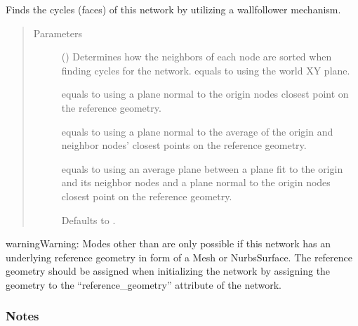 \documentclass[letterpaper,10pt,english]{sphinxmanual}
\begin{document}
\begin{fulllineitems}
\begin{fulllineitems}
\label{\detokenize{cockatoo:cockatoo.KnitNetwork.find_cycles}}
Finds the cycles (faces) of this network by utilizing a wall\sphinxhyphen{}follower
mechanism.
\begin{quote}\begin{description}
\item[{Parameters}] \leavevmode
{} (\sphinxstyleliteralemphasis{\sphinxupquote{, }}) \textendash{} 
Determines how the neighbors of each node are sorted when finding
cycles for the network.
 equals to using the world XY plane.

 equals to using a plane normal to the origin nodes closest
point on the reference geometry.

 equals to using a plane normal to the average of the origin
and neighbor nodes’ closest points on the reference geometry.

 equals to using an average plane between a plane fit to the
origin and its neighbor nodes and a plane normal to the origin
nodes closest point on the reference geometry.

Defaults to .


\end{description}\end{quote}

\begin{sphinxadmonition}{warning}{Warning:}
Modes other than  are only possible if this network has an
underlying reference geometry in form of a Mesh or NurbsSurface. The
reference geometry should be assigned when initializing the network by
assigning the geometry to the “reference\_geometry” attribute of the
network.
\end{sphinxadmonition}
\subsubsection*{Notes}


\end{fulllineitems}
\end{fulllineitems}
\end{document}
